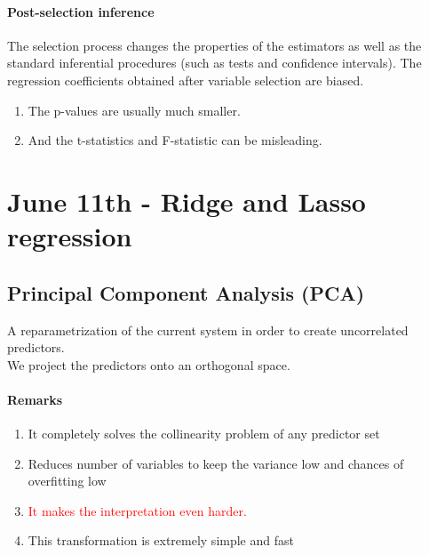\documentclass[11pt]{article}
\begin{document}
\paragraph{Post-selection inference}
The selection process changes the properties of the estimators as well as the standard inferential procedures (such as tests and confidence intervals). The regression coefficients obtained after variable selection are biased.
\begin{enumerate}
	\item The p-values are usually much smaller.
	\item And the t-statistics and F-statistic can be misleading.
\end{enumerate}

\section{June 11th - Ridge and Lasso regression}
\subsection{Principal Component Analysis (PCA)}
A reparametrization of the current system in order to create uncorrelated predictors. \\
We project the predictors onto an orthogonal space.
\paragraph{Remarks}
\begin{enumerate}
	\item It completely solves the collinearity problem of any predictor set
	\item Reduces number of variables to keep the variance low and chances of overfitting low
	\item \textcolor{red}{It makes the interpretation even harder.}
	\item This transformation is extremely simple and fast
\end{enumerate}
\end{document}
